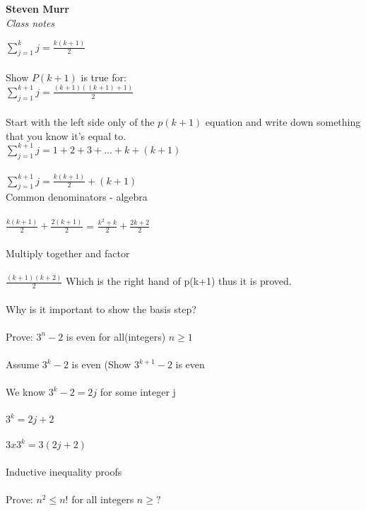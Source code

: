 \documentclass{article}
\begin{document}
\setcounter{totalnumber}{5}
   \begin{flushright}
      \Large\textbf{Steven Murr}\\
      \large\textit{Class notes}
   \end{flushright}
\begin{flushleft}
\makeatletter%
\setlength{\@fptop}{5pt}
\makeatother
$\sum\limits_{j=1}^k j = \frac{k(k+1)}{2}$ \\
~\\
Show $P(k+1)$ is true for: \\
$\sum\limits_{j=1}^{k+1} j = \frac{(k+1)((k+1)+1)}{2}$ \\
~\\
Start with the left side only of the $p(k+1)$ equation and write down something that you know it's equal to. \\
$\sum\limits_{j=1}^{k+1} j = 1+2+3+...+k+(k+1)$ \\
~\\
$\sum\limits_{j=1}^{k+1} j = \frac{k(k+1)}{2} + (k+1)$ \\
Common denominators - algebra \\
~\\
$\frac{k(k+1)}{2} + \frac{2(k+1)}{2}$  = $\frac{k^2+k}{2} + \frac{2k+2}{2}$ \\
~\\
Multiply together and factor \\
~\\
$\frac{(k+1)(k+2)}{2}$ Which is the right hand of p(k+1) thus it is proved. \\
~\\
Why is it important to show the basis step? \\
~\\
Prove: $3^n -2$ is even for all(integers) $n \geq 1$ \\
~\\
Assume $3^k-2$ is even (Show $3^{k+1}-2$ is even \\
~\\
We know $3^k -2 = 2j$ for some integer j \\
~\\
$3^k = 2j+2$ \\
~\\
$3x3^k = 3(2j+2)$  \\
~\\
Inductive inequality proofs \\
~\\
Prove: $n^2 \leq n!$ for all integers $n \geq ?$ \\

\end{flushleft}
\end{document}

